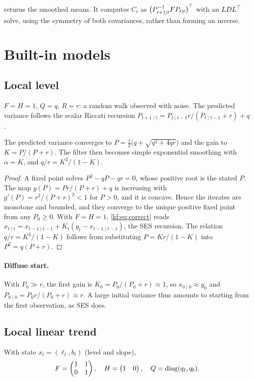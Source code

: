  returns the smoothed means. It computes
$C_t$ as $\big(P_{t+1\mid t}^{-1}FP_{t\mid t}\big)^\top$ with an $LDL^\top$ solve,
using the symmetry of both covariances, rather than forming an inverse.

\section{Built-in models}

\subsection{Local level}
$F=H=1$, $Q=q$, $R=r$: a random walk observed with noise. The predicted variance
follows the scalar Riccati recursion
$P_{t+1\mid t} = P_{t\mid t-1}r/(P_{t\mid t-1}+r) + q$.

\begin{proposition}\label{kf:prop:ll-steady}
The predicted variance converges to $P=\tfrac12\big(q+\sqrt{q^2+4qr}\big)$ and
the gain to $K=P/(P+r)$. The filter then becomes simple exponential smoothing with
$\alpha=K$, and $q/r=K^2/(1-K)$.
\end{proposition}
\begin{proof}
A fixed point solves $P^2-qP-qr=0$, whose positive root is the stated $P$. The map
$g(P)=Pr/(P+r)+q$ is increasing with $g'(P)=r^2/(P+r)^2<1$ for $P>0$, and it is
concave. Hence the iterates are monotone and bounded, and they converge to the
unique positive fixed point from any $P_0\ge0$. With $F=H=1$, \eqref{kf:eq:correct}
reads $x_{t\mid t}=x_{t-1\mid t-1}+K_t(y_t-x_{t-1\mid t-1})$, the SES recursion. The
relation $q/r=K^2/(1-K)$ follows from substituting $P=Kr/(1-K)$ into
$P^2=q(P+r)$.
\end{proof}

\paragraph{Diffuse start.}
With $P_0\gg r$, the first gain is $K_0=P_0/(P_0+r)\approx1$, so
$x_{0\mid0}\approx y_0$ and $P_{0\mid0}=P_0r/(P_0+r)\approx r$. A large initial
variance thus amounts to starting from the first observation, as SES does.

\subsection{Local linear trend}
With state $x_t=(\ell_t,b_t)$ (level and slope),
\[
  F=\begin{pmatrix}1&1\\0&1\end{pmatrix},\quad H=\begin{pmatrix}1&0\end{pmatrix},\quad
  Q=\operatorname{diag}(q_\ell,q_b).
\]

